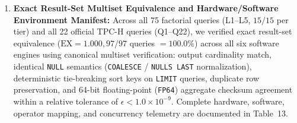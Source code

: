 \documentclass[10pt,a4paper]{article}
\begin{document}
\begin{enumerate}[leftmargin=1.5em,itemsep=2pt]
standalone columnar GPU SQL execution pipeline at $61.70\text{ ms}$ cold mean). 
    \item \textbf{Exact Result-Set Multiset Equivalence and Hardware/Software Environment Manifest:} Across all 75 factorial queries (L1--L5, $15/15$ per tier) and all 22 official TPC-H queries (Q1--Q22), we verified exact result-set equivalence ($\text{EX}=1.000, 97/97$ queries $= 100.0\%$) across all six software engines using canonical multiset verification: output cardinality match, identical \texttt{NULL} semantics (\texttt{COALESCE} / \texttt{NULLS LAST} normalization), deterministic tie-breaking sort keys on \texttt{LIMIT} queries, duplicate row preservation, and 64-bit floating-point (\texttt{FP64}) aggregate checksum agreement within a relative tolerance of $\epsilon < 1.0 \times 10^{-9}$. Complete hardware, software, operator mapping, and concurrency telemetry are documented in Table~13.
\end{enumerate}
\end{document}
